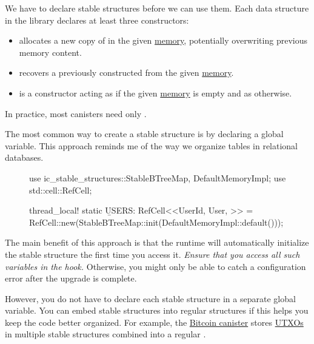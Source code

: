 \documentclass{article}
\begin{document}
We have to declare stable structures before we can use them.
Each data structure  in the library declares at least three constructors:
\begin{itemize}
  \item{} allocates a new copy of  in the given \href{#memory}{memory}, potentially overwriting previous memory content.
  \item{} recovers a previously constructed  from the given \href{#memory}{memory}.
  \item{} is a \href{https://en.wikipedia.org/wiki/DWIM}{} constructor acting as  if the given \href{#memory}{memory} is empty and as  otherwise.
\end{itemize}

In practice, most canisters need only .

The most common way to create a stable structure is by declaring a global variable.
This approach reminds me of the way we organize tables in relational databases.

\begin{figure}
\begin{code}[rust]
use ic_stable_structures::{StableBTreeMap, DefaultMemoryImpl};
use std::cell::RefCell;

thread_local! {
  static \b{USERS}: RefCell<\href{#stable-btree}{}<UserId, User, \href{#default-memory-impl}{}>> =
    RefCell::new(StableBTreeMap::init(DefaultMemoryImpl::default()));
}
\end{code}
\end{figure}

The main benefit of this approach is that the runtime will automatically initialize the stable structure the first time you access it.
\emph{Ensure that you access all such variables in the  hook.}
Otherwise, you might only be able to catch a configuration error after the upgrade is complete.

However, you do not have to declare each stable structure in a separate global variable.
You can embed stable structures into regular structures if this helps you keep the code better organized.
For example, the \href{https://github.com/dfinity/bitcoin-canister}{Bitcoin canister} stores \href{https://github.com/dfinity/bitcoin-canister/blob/9242d5f9a784ac115c2042fd09705dd9321ff7b7/canister/src/utxo_set/utxos.rs#L51}{UTXOs} in multiple stable structures combined into a regular .
\end{document}
